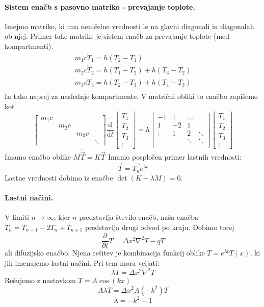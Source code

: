 \documentclass[a4paper]{article}
\newcommand{\vct}[1]{\overrightarrow{#1}}
\newcommand{\pd}[2]{\frac{\partial {#1}}{\partial {#2}}}
\newcommand{\dd}[2]{\frac{\mathrm{d} {#1}}{\mathrm{d} {#2}}}
\begin{document}
\paragraph{Sistem enačb s pasovno matriko - prevajanje toplote.} Imejmo matriko, ki ima neničelne vrednosti le na glavni diagonali in diagonalah ob njej.
Primer take matrike je sistem enačb za prevajanje toplote (med kompartmenti).
\begin{eqnarray*}
    m_1c\dot{T}_1 = h (T_2 - T_1) \\
    m_2c\dot{T}_2 = h (T_1 - T_2) + h (T_3 - T_2) \\
    m_3c\dot{T}_3 = h (T_2 - T_3) + h (T_4 - T_3) \\
\end{eqnarray*}
In tako naprej za naslednje kompartmente. V matrični obliki to enačbo zapišemo kot
$$\begin{bmatrix}
    m_1 c &&& \\
    & m_2 c && \\
    && m_3 c & \\
    &&& \ddots
\end{bmatrix}\dd{}{t}\begin{bmatrix}
    T_1 \\ T_2 \\ T_3 \\ \vdots
\end{bmatrix} = h\begin{bmatrix}
    -1 & 1 & \dots & \\
    1 & -2 & 1 & \\
    \vdots & 1 & 2 & \ddots \\
    & & \ddots & \ddots \\
\end{bmatrix}\begin{bmatrix}
    T_1 \\ T_2 \\ T_3 \\ \vdots
\end{bmatrix}$$
Imamo enačbo oblike $M\dot{\vct{T}} = K\vct{T}$
Imamo posplošen primer lastnih vrednosti:
$$\vct{T} = \vct{T_{n}}e^{\lambda t}$$
Lastne vrednosti dobimo iz enačbe $\det (K - \lambda M) = 0$.
\paragraph{Lastni načini.} V limiti $n \to \infty$, kjer $n$ predstavlja število enačb, naša enačba $\dot{T}_n = T_{n-1} - 2T_{n} + T_{n+1}$
predstavlja drugi odvod po kraju. Dobimo torej
$$\pd{}{t}T = \Delta x^2 \nabla^2 T - qT$$
ali difuzijsko enačbo. Njena rešitev je kombinacija funkcij oblike $T = e^{\lambda t} T(x)$, ki jih imenujemo lastni načini. Pri tem mora veljati:
$$\lambda T = \Delta x^2 \nabla^2 T$$
Rešujemo z nastavkom $T = A\cos(kx)$
$$A \lambda T = \Delta x^2 A (-k^2) T$$
$$\lambda = -k^2 - 1$$
\end{document}
